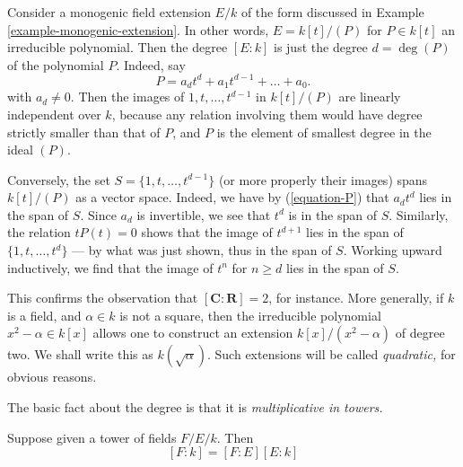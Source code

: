\begin{example}
\label{example-degree-simple-algebraic-extension}
Consider a monogenic field extension $E/k$ of the form discussed in
Example \ref{example-monogenic-extension}.
In other words, $E = k[t]/(P)$ for $P \in k[t]$ an irreducible polynomial.
Then the degree $[E : k]$ is just the degree $d = \deg(P)$ of the
polynomial $P$. Indeed, say
\begin{equation}
\label{equation-P}
P = a_d t^d + a_1 t^{d - 1} + \dots + a_0.
\end{equation}
with $a_d \not = 0$. Then the images of $1, t, \dots, t^{d - 1}$ in
$k[t]/(P)$ are linearly independent over $k$, because any relation involving
them would have degree strictly smaller than that of $P$, and $P$ is the
element of smallest degree in the ideal $(P)$.

\medskip\noindent
Conversely, the set $S = \{1, t, \dots, t^{d - 1}\}$ (or more
properly their images) spans $k[t]/(P)$ as a vector space.
Indeed, we have by (\ref{equation-P}) that $a_d t^d$ lies in the span of $S$.
Since $a_d$ is invertible, we see that $t^d$ is in the span of $S$.
Similarly, the relation $t P(t) = 0$ shows that the image of $t^{d + 1}$
lies in the span of $\{1, t, \dots, t^d\}$ --- by what was just shown, thus
in the span of $S$. Working upward inductively, we find
that the image of $t^n$ for $n \geq d$ lies in the span of $S$.
\end{example}

\noindent
This confirms the observation that $[\mathbf{C}: \mathbf{R}] = 2$, for
instance. More generally, if $k$ is a field, and $\alpha \in k$ is not a
square, then the irreducible polynomial $x^2 - \alpha \in k[x]$ allows one
to construct an extension $k[x]/(x^2 - \alpha)$ of degree two.
We shall write this as $k(\sqrt{\alpha})$. Such extensions will be called
{\it quadratic,} for obvious reasons.

\medskip\noindent
The basic fact about the degree is that it is {\it multiplicative in towers.}

\begin{lemma}[Multiplicativity]
\label{lemma-multiplicativity-degrees}
Suppose given a tower of fields $F/E/k$. Then
$$
[F:k] = [F:E][E:k]
$$
\end{lemma}


